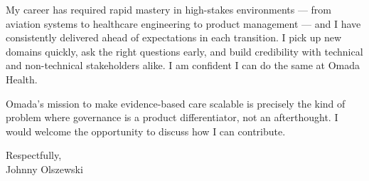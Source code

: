 \documentclass[11pt,letterpaper]{article}
\begin{document}
My career has required rapid mastery in high-stakes environments — from aviation systems to healthcare engineering to product management — and I have consistently delivered ahead of expectations in each transition. I pick up new domains quickly, ask the right questions early, and build credibility with technical and non-technical stakeholders alike. I am confident I can do the same at Omada Health.

Omada's mission to make evidence-based care scalable is precisely the kind of problem where governance is a product differentiator, not an afterthought. I would welcome the opportunity to discuss how I can contribute.

\vspace{0.5em}

Respectfully,\\[2em]
Johnny Olszewski
\end{document}
